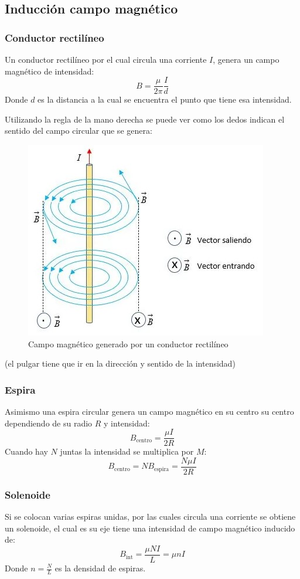 \documentclass[arial,a4paper,print]{article}
\begin{document}
\subsection{Inducción campo magnético}
\subsubsection{Conductor rectilíneo}
Un conductor rectilíneo por el cual circula una corriente $I$, genera un campo magnético de intensidad:
\begin{equation*}
	B=\frac{\mu}{2\pi}\frac{I}{d}
\end{equation*}
Donde $d$ es la distancia a la cual se encuentra el punto que tiene esa intensidad. 

Utilizando la regla de la mano derecha se puede ver como los dedos indican el sentido del campo circular que se genera:
\begin{figure}[h]
	\centering
	\includegraphics[width=0.5\linewidth]{figures/magnetico_linea}
	\caption{Campo magnético generado por un conductor rectilíneo}
	\label{fig:magneticolinea}
\end{figure}
(el pulgar tiene que ir en la dirección y sentido de la intensidad)

\subsubsection{Espira}
Asimismo una espira circular genera un campo magnético en su centro su centro dependiendo de su radio $R$ y intensidad:
\begin{equation*}
	B_{\text{centro}} = \frac{\mu I}{2R}
\end{equation*}
Cuando hay $N$ juntas la intensidad se multiplica por $M$:
\begin{equation*}
	B_{\text{centro}} = NB_{\text{espira}} = \frac{N\mu I}{2R}
\end{equation*}

\subsubsection{Solenoide}
Si se colocan varias espiras unidas, por las cuales circula una corriente se obtiene un solenoide, el cual es su eje tiene una intensidad de campo magnético inducido de:
\begin{equation*}
	B_{\text{int}} = \frac{\mu NI}{L} = \mu nI
\end{equation*}
Donde $n=\frac{N}{L}$ es la densidad de espiras. 
\end{document}
